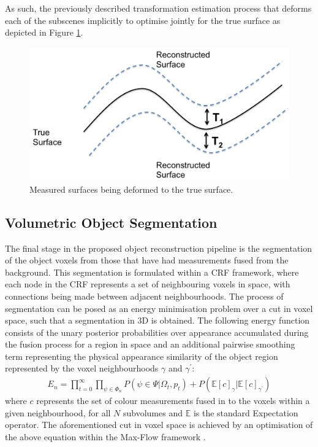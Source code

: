 As such, the previously described transformation estimation process that deforms each of the subscenes implicitly to optimise jointly for the true 
surface as depicted in Figure \ref{fig:deformationDiagram}.
\begin{figure}[!t]
	\centering
	\includegraphics[scale=0.25]{deformation.png}
	\vspace{-3mm}
	\caption{Measured surfaces being deformed to the true surface.}
	\label{fig:deformationDiagram}
\end{figure}

\subsection{Volumetric Object Segmentation}
\label{subsec:shapeoptimisation}
The final stage in the proposed object reconstruction pipeline is the segmentation of the object voxels from those that have had measurements fused 
from the background. This segmentation is formulated within a CRF framework, where each node in the CRF represents a set of neighbouring voxels in space, 
with connections being made between adjacent neighbourhoods. The process of segmentation can be posed as an energy minimisation problem over a cut in voxel space, 
such that a segmentation in 3D is obtained. The following energy function consists of the unary posterior probabilities over appearance accumulated during the fusion 
process for a region in space and an additional pairwise smoothing term representing the physical appearance similarity of the object region represented by the voxel 
neighbourhoods $\gamma$ and $\gamma^{'}$:
\begin{equation}
\begin{split}
E_{n} = \prod_{t=0}^{\infty} \prod_{\psi \in \Phi_{n}} P(\psi \in \Psi | \Omega_{t}, p_{t}) + P(\mathbb{E}[c]_{\gamma} | \mathbb{E}[c]_{\gamma^{'}})
\end{split}
\end{equation}
where $c$ represents the set of colour measurements fused in to the voxels within a given neighbourhood, for all $N$ subvolumes and $\mathbb{E}$ is the standard Expectation operator.
The aforementioned cut in voxel space is achieved by an optimisation of the above equation within the Max-Flow framework \cite{BoykovKolmogorov}. 

